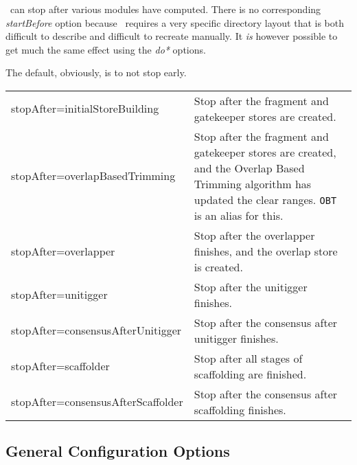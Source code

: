 \documentclass[twoside,11pt]{article}
\begin{document}
\runCA\ can stop after various modules have computed.  There is no
corresponding {\it startBefore} option because \runCA\ requires a very
specific directory layout that is both difficult to describe and
difficult to recreate manually.  It {\em is} however possible to get
much the same effect using the {\it do*} options.

The default, obviously, is to not stop early.

\begin{longtable}{lp{3.0in}}

stopAfter=initialStoreBuilding &
Stop after the fragment and gatekeeper stores are created.
\\

stopAfter=overlapBasedTrimming &
Stop after the fragment and gatekeeper stores are created, and the
Overlap Based Trimming algorithm has updated the clear ranges.
{\tt OBT} is an alias for this.
\\

stopAfter=overlapper &
Stop after the overlapper finishes, and the overlap store is created.
\\

stopAfter=unitigger &
Stop after the unitigger finishes.
\\

stopAfter=consensusAfterUnitigger &
Stop after the consensus after unitigger finishes.
\\

stopAfter=scaffolder &
Stop after all stages of scaffolding are finished.
\\

stopAfter=consensusAfterScaffolder &
Stop after the consensus after scaffolding finishes.
\\

\end{longtable}


\subsection{General Configuration Options}
\end{document}
